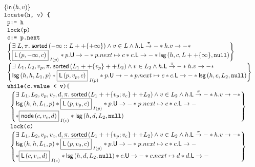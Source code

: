 \[
\begin{array}{l}
	\left\{\inSet{h}{v} \right\}\\
	\command{locate(h, v) \{}\\
	\begin{array}{l}
		\command{p:= h}\\
		\command{lock(p)}\\
		\command{c:= p.next}\\
		
		\left\{
		\begin{array}{@{} l @{}}
			\exsts{L, \pi} \sorted{-\infty :: L ++ \{+\infty\}} \land v \in L \land  \lockT{h}[\pi] * \valueT{h}{v} * \\
			 \shared{\lockedNode{p}{-\infty}{c}}{I(p)} * \unlockT{p} * \cell{p.next}{c} * \lockT{c} * \lsg{h}{c}{L++\{\infty\}}{\nil}
		\end{array}	 
		\right\}\\
		
		
		\left\{
		\begin{array}{@{} l @{}}
			\exsts{L_1, L_2, v_p, \pi} \sorted{L_1 ++\{v_p\}  ++ L_2} \land v \in L_2 \land \lockT{h}[\pi] * \valueT{h}{v} * \\
			\lsg{h}{h}{L_1}{p} * \shared{\lockedNode{p}{v_p}{c}}{I(p)} * \unlockT{p} * \cell{p.next}{c} * \lockT{c} * \lsg{h}{c}{L_2}{\nil}
		\end{array}
		\right\}\\
		
		\command{while(c.value < v)\{}\\
			\begin{array}{l}
				\left\{
				\begin{array}{@{} l @{}}
					\exsts{L_1, L_2, v_p, v_c, d, \pi} \sorted{L_1 ++ \{v_p; v_c\} ++L_2} \land v \in L_2 \land \lockT{h}[\pi] * \valueT{h}{v} * \\
					\lsg{h}{h}{L_1}{p} * 
				 	\shared{\lockedNode{p}{v_p}{c}}{I(p)} * \unlockT{p} * \cell{p.next}{c} * \lockT{c}\\ 
				 	* \shared{\node{c}{v_c}{d}}{I(c)} * \lsg{h}{d}{L_2}{\nil}
				 	
			 	\end{array}
			 	\right\}\\
			 	
			 	
			 	\command{lock(c)}\\
			 	
			 	\left\{
				\begin{array}{@{} l @{}}
			 		\exsts{L_1, L_2, v_p, v_c, d, \pi} \sorted{L_1 ++ \{v_p; v_c\} ++L_2} \land v \in L_2 \land \lockT{h}[\pi] * \valueT{h}{v} * \\
					\lsg{h}{h}{L_1}{p} * 
			 		\shared{\lockedNode{p}{v_0}{c}}{I(p)} * \unlockT{p} * \cell{p.next}{c} * \lockT{c}\\ 
			 		* \shared{\lockedNode{c}{v_c}{d}}{I(c)} * \lsg{h}{d}{L_2}{\nil}
			 		* \unlockT{c} * \cell{c.next}{d} * \lockT{d}
			 	\end{array}
			 	\right\}\\
			 	

\end{array}
\end{array}
\end{array}\]
